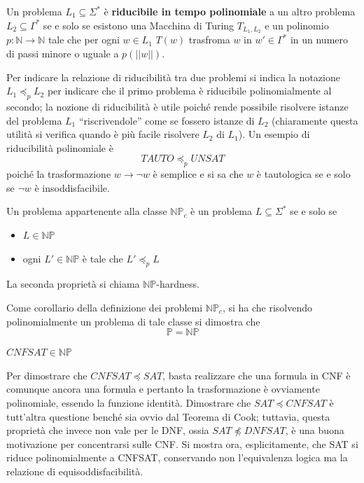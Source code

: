 \begin{defi}[Riducibilità]
        Un problema $L_1 \subseteq \Sigma^*$ è \textbf{riducibile in tempo polinomiale} 
        a un altro problema $L_2 \subseteq \Gamma^*$ se e solo se esistono
        una Macchina di Turing $T_{{L_1}, {L_2}}$ e un polinomio
        $p: \mathbb{N} \rightarrow \mathbb{N}$ tale che per ogni $w \in L_1$
        $T(w)$ trasfroma $w$ in $w' \in \Gamma^*$ in un numero di passi 
        minore o uguale a $p(||w||)$. 
\end{defi}

Per indicare la relazione di riducibilità tra due problemi si indica la notazione 
$L_1 \preceq_p L_2$ per indicare che il primo problema è riducibile polinomialmente 
al secondo; la nozione di riducibilità è utile poiché rende possibile risolvere 
istanze del problema $L_1$ ``riscrivendole'' come se fossero istanze di $L_2$
(chiaramente questa utilità si verifica quando è più facile risolvere $L_2$ di 
$L_1$). 
Un esempio di riducibilità polinomiale è 
$$
TAUTO \preceq_p UNSAT
$$
poiché la trasformazione $w \rightarrow \neg w$ è semplice e si sa che 
$w$ è tautologica se e solo se $\neg w$ è insoddisfacibile.

\begin{defi}
        Un problema appartenente alla classe $\mathbb{NP}_c$ è un problema 
        $L \subseteq \Sigma^*$ se e solo se 
        \begin{itemize}
                \item $L \in \mathbb{NP}$
                \item ogni $L' \in \mathbb{NP}$ è tale che $L' \preceq_p L$ 
        \end{itemize}
        La seconda proprietà si chiama $\mathbb{NP}$-hardness. 
\end{defi}
Come corollario della definizione dei problemi $\mathbb{NP}_c$, si ha che risolvendo 
polinomialmente un problema di tale classe si dimostra che 
$$
\mathbb{P} = \mathbb{NP}
$$

\begin{teo}
        $CNFSAT \in \mathbb{NP}$
\end{teo}

Per dimostrare che $CNFSAT \preceq SAT$, basta realizzare che una formula 
in CNF è comunque ancora una formula e pertanto la trasformazione è ovviamente 
polinomiale, essendo la funzione identità. Dimostrare che $SAT \preceq CNFSAT$ 
è tutt'altra questione benché sia ovvio dal Teorema di Cook; tuttavia, questa 
proprietà che invece non vale per le DNF, ossia $SAT \npreceq DNFSAT$, è una 
buona motivazione per concentrarsi sulle CNF. 
Si mostra ora, esplicitamente, che SAT si riduce polinomialmente a CNFSAT, 
conservando non l'equivalenza logica ma la relazione di equisoddisfacibilità. 

